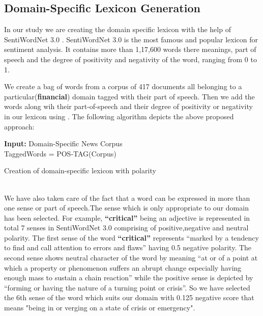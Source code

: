 \documentclass[a4paper, 10pt, conference]{ieeeconf}      %
\begin{document}
\subsection{Domain-Specific Lexicon Generation}
In our study we are creating the domain specific lexicon with the help of SentiWordNet 3.0 \cite{c1}. SentiWordNet 3.0 is the most famous and popular lexicon for sentiment analysis. It contains more than 1,17,600 words  there meanings, part of speech  and the degree of positivity and negativity of the word, ranging from 0 to 1.

We create a bag of words from a corpus of 417 documents all belonging to a particular(\textbf{financial}) domain tagged with their part of speech. Then we add the words along wih their part-of-speech and their degree of positivity or negativity in our lexicon using \cite{c1}. The following algorithm depicts the above proposed approach:  
\begin{algorithm}
	\SetAlgoLined
	\textbf{Input:} Domain-Specific News Corpus\\
	TaggedWords = POS-TAG(Corpus)\\
	
	\caption{Creation of domain-specific lexicon with polarity}
\end{algorithm}
\\We have also taken care of the fact that a word can be expressed in more than one sense or part of speech.The sense which is only appropriate to our domain has been selected. For example, \textbf{``critical''} being an adjective is represented in total 7 senses in SentiWordNet 3.0 comprising of positive,negative and neutral polarity. The first sense of the word \textbf{``critical''} represents ``marked by a tendency to find and call attention to errors and flaws'' having 0.5 negative polarity. The second sense shows neutral character of the word by meaning ``at or of a point at which a property or phenomenon suffers an abrupt change especially having enough mass to sustain a chain reaction'' while the positive sense is depicted by ``forming or having the nature of a turning point or crisis''. So we have selected the 6th sense of the word which suits our domain with 0.125 negative score that means "being in or verging on a state of crisis or emergency".
\end{document}
